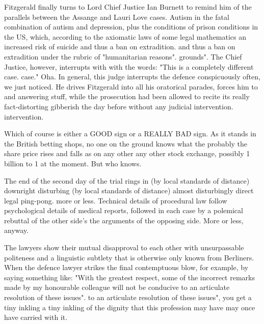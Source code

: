 \begin{multicols}{2}
Fitzgerald finally turns to Lord Chief Justice
Ian Burnett to remind him of the parallels between the Assange and Lauri Love cases. Autism in the
fatal combination of autism and depression, plus the conditions of
prison conditions in the US, which, according to the axiomatic laws of some legal mathematics
an increased risk of suicide and thus a ban on extradition.
and thus a ban on extradition under the rubric of "humanitarian reasons".
grounds". The Chief Justice, however, interrupts with
with the words: "This is a completely different case.
case." Oha. In general, this judge interrupts the defence conspicuously often, we just noticed. He drives Fitzgerald into all his oratorical parades, forces him to
and answering stuff, while the prosecution had been allowed to recite its really fact-distorting gibberish the day before without any judicial intervention.
intervention.

Which of course is either a GOOD sign or a REALLY BAD sign. As it stands in the British
betting shops, no one on the ground knows what the
probably the share price rises and falls as on any other
any other stock exchange, possibly 1 billion to 1 at the moment.
But who knows.

The end of the second day of the trial rings in
(by local standards of distance) downright disturbing
(by local standards of distance) almost disturbingly direct legal ping-pong.
more or less. Technical details of procedural law follow
psychological details of medical reports,
followed in each case by a polemical rebuttal of the other side's
the arguments of the opposing side. More or less, anyway.

The lawyers show their mutual disapproval to each other
with unsurpassable politeness and a linguistic
subtlety that is otherwise only known from Berliners. When
the defence lawyer strikes the final contemptuous blow, for example, by saying something like: "With the greatest respect, some of the incorrect remarks made by my honourable colleague will not be conducive to an articulate resolution of these issues".
to an articulate resolution of these issues", you get a tiny inkling
a tiny inkling of the dignity that this profession may have
may once have carried with it.


\end{multicols}
